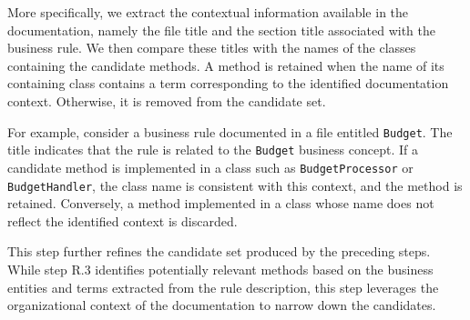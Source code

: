 More specifically, we extract the contextual information available in the documentation, namely the file title and the section title associated with the business rule. We then compare these titles with the names of the classes containing the candidate methods. A method is retained when the name of its containing class contains a term corresponding to the identified documentation context. Otherwise, it is removed from the candidate set.

For example, consider a business rule documented in a file entitled \texttt{Budget}. The title indicates that the rule is related to the \texttt{Budget} business concept. If a candidate method is implemented in a class such as \texttt{BudgetProcessor} or \texttt{BudgetHandler}, the class name is consistent with this context, and the method is retained. Conversely, a method implemented in a class whose name does not reflect the identified context is discarded.

This step further refines the candidate set produced by the preceding steps. While step R.3 identifies potentially relevant methods based on the business entities and terms extracted from the rule description, this step leverages the organizational context of the documentation to narrow down the candidates.